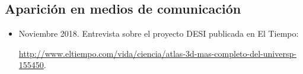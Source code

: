 \documentclass{article}
\begin{document}
\subsection{Aparici\'on en medios de comunicaci\'on}

\begin{itemize}
\item Noviembre 2018. Entrevista sobre el proyecto DESI publicada en El Tiempo:

 \url{http://www.eltiempo.com/vida/ciencia/atlas-3d-mas-completo-del-universp-155450}.
\end{itemize}
\end{document}
